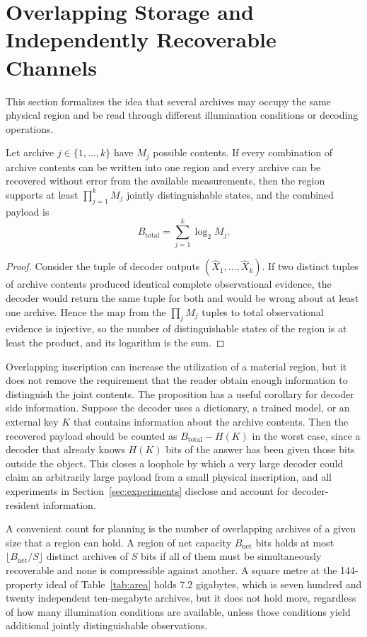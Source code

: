 \section{Overlapping Storage and Independently Recoverable Channels}\label{sec:overlap}

This section formalizes the idea that several archives may occupy the same physical region and be read through different illumination conditions or decoding operations.

\begin{proposition}\label{prop:overlap}
Let archive $j\in\{1,\dots,k\}$ have $M_j$ possible contents. If every combination of archive contents can be written into one region and every archive can be recovered without error from the available measurements, then the region supports at least $\prod_{j=1}^{k}M_j$ jointly distinguishable states, and the combined payload is
\[
B_{\mathrm{total}}=\sum_{j=1}^{k}\log_2 M_j .
\]
\end{proposition}

\begin{proof}
Consider the tuple of decoder outputs $(\widehat X_1,\dots,\widehat X_k)$. If two distinct tuples of archive contents produced identical complete observational evidence, the decoder would return the same tuple for both and would be wrong about at least one archive. Hence the map from the $\prod_j M_j$ tuples to total observational evidence is injective, so the number of distinguishable states of the region is at least the product, and its logarithm is the sum.
\end{proof}

Overlapping inscription can increase the utilization of a material region, but it does not remove the requirement that the reader obtain enough information to distinguish the joint contents. The proposition has a useful corollary for decoder side information. Suppose the decoder uses a dictionary, a trained model, or an external key $K$ that contains information about the archive contents. Then the recovered payload should be counted as $B_{\mathrm{total}}-H(K)$ in the worst case, since a decoder that already knows $H(K)$ bits of the answer has been given those bits outside the object. This closes a loophole by which a very large decoder could claim an arbitrarily large payload from a small physical inscription, and all experiments in Section~\ref{sec:experiments} disclose and account for decoder-resident information.

A convenient count for planning is the number of overlapping archives of a given size that a region can hold. A region of net capacity $B_{\mathrm{net}}$ bits holds at most $\lfloor B_{\mathrm{net}}/S\rfloor$ distinct archives of $S$ bits if all of them must be simultaneously recoverable and none is compressible against another. A square metre at the 144-property ideal of Table~\ref{tab:area} holds 7.2 gigabytes, which is seven hundred and twenty independent ten-megabyte archives, but it does not hold more, regardless of how many illumination conditions are available, unless those conditions yield additional jointly distinguishable observations.

